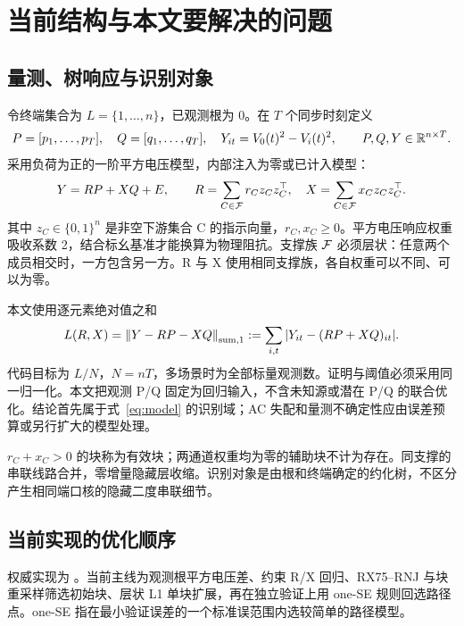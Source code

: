 \section{当前结构与本文要解决的问题}
\label{sec:current}
\subsection{量测、树响应与识别对象}
令终端集合为 $L=\{1,\ldots,n\}$，已观测根为 $0$。在 $T$ 个同步时刻定义
\begin{equation}
 P=[p_1,\ldots,p_T],\quad Q=[q_1,\ldots,q_T],\quad
 Y_{it}=V_0(t)^2-V_i(t)^2,\qquad P,Q,Y\in\mathbb R^{n\times T}.
 \label{eq:data}
\end{equation}
采用负荷为正的一阶平方电压模型，内部注入为零或已计入模型：
\begin{equation}
 Y=RP+XQ+E,\qquad
 R=\sum_{C\in\mathcal F}r_Cz_Cz_C^\top,\quad
 X=\sum_{C\in\mathcal F}x_Cz_Cz_C^\top.
 \label{eq:model}
\end{equation}
其中 $z_C\in\{0,1\}^n$ 是非空下游集合 C 的指示向量，$r_C,x_C\ge0$。平方电压响应权重吸收系数 2，结合标幺基准才能换算为物理阻抗。支撑族 $\mathcal F$ 必须层状：任意两个成员相交时，一方包含另一方。R 与 X 使用相同支撑族，各自权重可以不同、可以为零。

本文使用逐元素绝对值之和
\begin{equation}
 L(R,X)=\left\lVert Y-RP-XQ\right\rVert_{\mathrm{sum},1}:=\sum_{i,t}|Y_{it}-(RP+XQ)_{it}|.
 \label{eq:loss}
\end{equation}
代码目标为 $L/N$，$N=nT$，多场景时为全部标量观测数。证明与阈值必须采用同一归一化。本文把观测 P/Q 固定为回归输入，不含未知源或潜在 P/Q 的联合优化。结论首先属于式~\eqref{eq:model} 的识别域；AC 失配和量测不确定性应由误差预算或另行扩大的模型处理。

\begin{definition}[有效块与约化树]
$r_C+x_C>0$ 的块称为有效块；两通道权重均为零的辅助块不计为存在。同支撑的串联线路合并，零增量隐藏层收缩。识别对象是由根和终端确定的约化树，不区分产生相同端口核的隐藏二度串联细节。
\end{definition}

\subsection{当前实现的优化顺序}
权威实现为 。当前主线为观测根平方电压差、约束 R/X 回归、RX75--RNJ 与块重采样筛选初始块、层状 L1 单块扩展，再在独立验证上用 one-SE 规则回选路径点。one-SE 指在最小验证误差的一个标准误范围内选较简单的路径模型。

